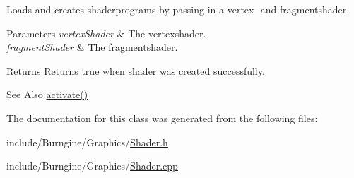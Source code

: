 Loads and creates shaderprograms by passing in a vertex-\/ and fragmentshader. 


\begin{DoxyParams}{Parameters}
{\em vertex\-Shader} & The vertexshader. \\
\hline
{\em fragment\-Shader} & The fragmentshader.\\
\hline
\end{DoxyParams}
\begin{DoxyReturn}{Returns}
Returns true when shader was created successfully.
\end{DoxyReturn}
\begin{DoxySeeAlso}{See Also}
\hyperlink{classburn_1_1_shader_a8f476e17b38b96d84ea57c31d7aab78d}{activate()} 
\end{DoxySeeAlso}


The documentation for this class was generated from the following files\-:\begin{DoxyCompactItemize}
\item 
include/\-Burngine/\-Graphics/\hyperlink{_shader_8h}{Shader.\-h}\item 
include/\-Burngine/\-Graphics/\hyperlink{_shader_8cpp}{Shader.\-cpp}\end{DoxyCompactItemize}
